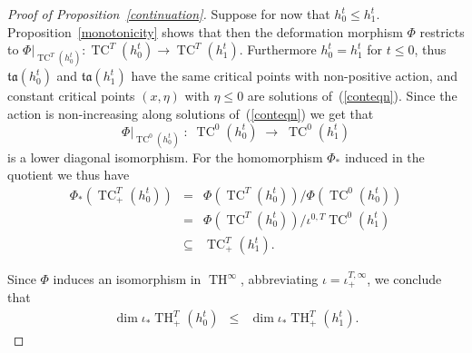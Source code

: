\documentclass{amsart}
\newcommand{\tacal}{{\mathfrak{ta}}}
\renewcommand{\TH}{\operatorname{TH}}
\newcommand{\TC}{\operatorname{TC}}
\theoremstyle{definition}
\theoremstyle{remark}
\numberwithin{equation}{section}
\begin{document}
\begin{proof}[Proof of Proposition~\ref{continuation}]
Suppose for now that $h_0^t\leq h_1^t$. Proposition~\ref{monotonicity} shows that then the deformation morphism $\Phi$ restricts to $\Phi|_{\TC^T(h_0^t)}:
\TC^T(h_0^t)\to \TC^T(h_1^t)$. Furthermore $h_0^t=h_1^t$ for $t\leq 0$, thus $\tacal(h_0^t)$ and $\tacal(h_1^t)$ have the same critical points with non-positive action, and constant critical points $(x,\eta)$ with $\eta\leq0$ are solutions of~(\ref{conteqn}). Since the action is non-increasing along solutions of~(\ref{conteqn}) we get that 
$$\Phi|_{\TC^0(h_0^t)}\;:\;\TC^0(h_0^t)\;\to\; \TC^0(h_1^t)$$
 is a lower diagonal isomorphism. For the homomorphism $\Phi_*$ induced in the quotient we thus have
\begin{eqnarray*}
	\Phi_*(\TC_+^T(h_0^t))&=&\Phi(\TC^T(h_0^t))/\Phi(\TC^0(h_0^t))\\
	&=&\Phi(\TC^T(h_0^t))/\iota^{0,T}\TC^0(h_1^t)\\
	&\subseteq&\TC_+^T(h_1^t).
\end{eqnarray*}

Since $\Phi$ induces an isomorphism in $\TH^\infty$, abbreviating $\iota=\iota_{+}^{T,\infty}$, we conclude that 
\begin{eqnarray}\label{monotonicity1}                                                                             
	\dim \iota_*\TH_+^T(h_0^t)&\leq&\dim \iota_*\TH_+^T(h_1^t).
\end{eqnarray}


\end{proof}
\end{document}
